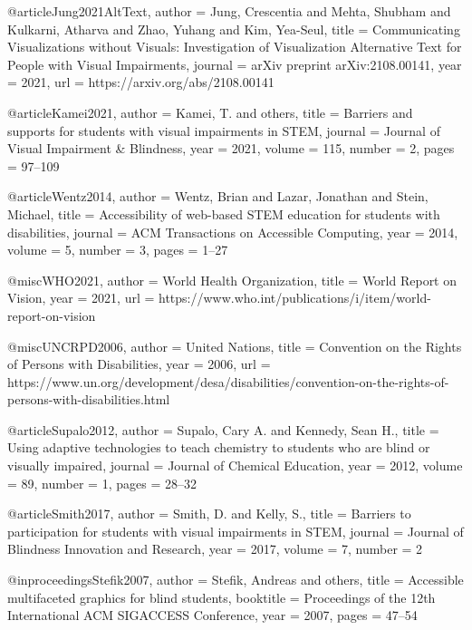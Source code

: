 @article{Jung2021AltText,
  author  = {Jung, Crescentia and Mehta, Shubham and Kulkarni, Atharva and Zhao, Yuhang and Kim, Yea-Seul},
  title   = {Communicating Visualizations without Visuals: Investigation of Visualization Alternative Text for People with Visual Impairments},
  journal = {arXiv preprint arXiv:2108.00141},
  year    = {2021},
  url     = {https://arxiv.org/abs/2108.00141}
}


@article{Kamei2021,
  author    = {Kamei, T. and others},
  title     = {Barriers and supports for students with visual impairments in STEM},
  journal   = {Journal of Visual Impairment \& Blindness},
  year      = {2021},
  volume    = {115},
  number    = {2},
  pages     = {97--109}
}

@article{Wentz2014,
  author    = {Wentz, Brian and Lazar, Jonathan and Stein, Michael},
  title     = {Accessibility of web-based STEM education for students with disabilities},
  journal   = {ACM Transactions on Accessible Computing},
  year      = {2014},
  volume    = {5},
  number    = {3},
  pages     = {1--27}
}

@misc{WHO2021,
  author    = {{World Health Organization}},
  title     = {World Report on Vision},
  year      = {2021},
  url       = {https://www.who.int/publications/i/item/world-report-on-vision}
}

@misc{UNCRPD2006,
  author    = {{United Nations}},
  title     = {Convention on the Rights of Persons with Disabilities},
  year      = {2006},
  url       = {https://www.un.org/development/desa/disabilities/convention-on-the-rights-of-persons-with-disabilities.html}
}

@article{Supalo2012,
  author    = {Supalo, Cary A. and Kennedy, Sean H.},
  title     = {Using adaptive technologies to teach chemistry to students who are blind or visually impaired},
  journal   = {Journal of Chemical Education},
  year      = {2012},
  volume    = {89},
  number    = {1},
  pages     = {28--32}
}

@article{Smith2017,
  author    = {Smith, D. and Kelly, S.},
  title     = {Barriers to participation for students with visual impairments in STEM},
  journal   = {Journal of Blindness Innovation and Research},
  year      = {2017},
  volume    = {7},
  number    = {2}
}

@inproceedings{Stefik2007,
  author    = {Stefik, Andreas and others},
  title     = {Accessible multifaceted graphics for blind students},
  booktitle = {Proceedings of the 12th International ACM SIGACCESS Conference},
  year      = {2007},
  pages     = {47--54}
}

